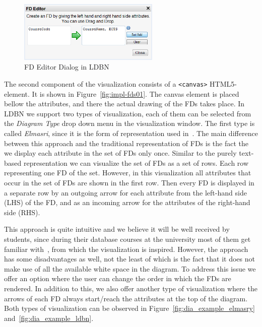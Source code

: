 \begin{figure}[ht]
	\begin{center}
		\includegraphics[width=0.6\textwidth]{./img/fdeditor.png}
		\caption{FD Editor Dialog in LDBN}
		\label{fig:fdeditor}
	\end{center}
\end{figure}

The second component of the visualization consists of a \verb=<canvas>= HTML5-element. 
It is shown in Figure~\ref{fig:impl-fds01}.
The canvas element is placed bellow the attributes, and there the actual drawing 
of the FDs takes place. In LDBN we support two types of visualization, each of them can be selected
from the \emph{Diagram Type} drop down menu in the visualization window. The first type is called 
\emph{Elmasri}, since it is the form of representation used in~\cite{bdb1}. 
The main difference between this approach and
the traditional representation of FDs is the fact the we display each attribute in the set of 
FDs only once. 
Similar to the purely text-based representation we can visualize the set
of FDs as a set of rows. Each row representing one FD of the set. 
However, in this visualization all attributes that occur in the set of FDs
are shown in the first row. Then every FD is displayed in a separate row by an outgoing 
arrow for each attribute from the left-hand side (LHS) of the FD,
and as an incoming arrow for the attributes of the right-hand side (RHS).

This approach is quite intuitive and we believe it will be well received by
students, since during their database courses at the university most of 
them get familiar with~\cite{bdb1}, from which
the visualization is inspired. However, the approach has some disadvantages
as well, not the least of which is the fact that it does not make use
of all the available white space in the diagram. To address this issue
we offer an option where the user can change the order in which
the FDs are rendered. In addition to this, we also offer another type of
visualization where the arrows of each FD always start/reach the 
attributes at the top of the diagram. 
Both types of visualization can be observed in 
Figure~\ref{fig:dia_example_elmasry} and~\ref{fig:dia_example_ldbn}.

